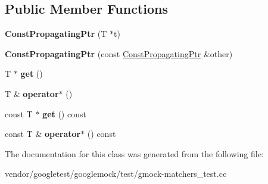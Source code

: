 \subsection*{Public Member Functions}
\begin{DoxyCompactItemize}
\item 
\mbox{\label{classtesting_1_1gmock__matchers__test_1_1_const_propagating_ptr_a06da70663daa274fb8ca3352f039d609}} 
{\bfseries Const\+Propagating\+Ptr} (T $\ast$t)
\item 
\mbox{\label{classtesting_1_1gmock__matchers__test_1_1_const_propagating_ptr_ae7620c62ba340603968896d5d5400ed1}} 
{\bfseries Const\+Propagating\+Ptr} (const \hyperlink{classtesting_1_1gmock__matchers__test_1_1_const_propagating_ptr}{Const\+Propagating\+Ptr} \&other)
\item 
\mbox{\label{classtesting_1_1gmock__matchers__test_1_1_const_propagating_ptr_a39a09d46453380ec1b8be8ce40adc453}} 
T $\ast$ {\bfseries get} ()
\item 
\mbox{\label{classtesting_1_1gmock__matchers__test_1_1_const_propagating_ptr_ad77bbeaa18f84cbd6f3dc7021904f1e3}} 
T \& {\bfseries operator$\ast$} ()
\item 
\mbox{\label{classtesting_1_1gmock__matchers__test_1_1_const_propagating_ptr_a92d7c8429246ef33a020e8a3d840b9c3}} 
const T $\ast$ {\bfseries get} () const
\item 
\mbox{\label{classtesting_1_1gmock__matchers__test_1_1_const_propagating_ptr_aad99a528754294ab397378034686ae3a}} 
const T \& {\bfseries operator$\ast$} () const
\end{DoxyCompactItemize}


The documentation for this class was generated from the following file\+:\begin{DoxyCompactItemize}
\item 
vendor/googletest/googlemock/test/gmock-\/matchers\+\_\+test.\+cc\end{DoxyCompactItemize}
